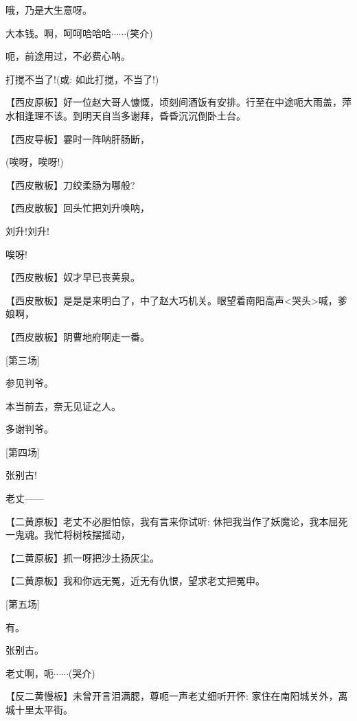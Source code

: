 {哦，乃是大生意呀。}

{大本钱。啊，呵呵哈哈哈$\cdots{}\cdots{}$(笑介)}

{呃，前途用过，不必费心呐。}

{打搅不当了!({\akai 或}: 如此打搅，不当了!)}

\setlength{\hangindent}{60pt} {【{\akai 西皮原板}】好一位赵大哥人慷慨，顷刻间酒饭有安排。行至在中途呃大雨盖，萍水相逢理不该。到明天自当多谢拜，昏昏沉沉倒卧土台。}

\setlength{\hangindent}{60pt} {【{\akai 西皮导板}】霎时一阵呐肝肠断，}

{(唉呀，唉呀!)}

\setlength{\hangindent}{60pt} {【{\akai 西皮散板}】刀绞柔肠为哪般?}

\setlength{\hangindent}{60pt} {【{\akai 西皮散板}】回头忙把刘升唤呐，}

{刘升!刘升!}

{唉呀!}

\setlength{\hangindent}{60pt} {【{\akai 西皮散板}】奴才早已丧黄泉。}

\setlength{\hangindent}{60pt} {【{\akai 西皮散板}】是是是来明白了，中了赵大巧机关。眼望着南阳高声\textless{}哭头\textgreater{}喊，爹娘啊，}

\setlength{\hangindent}{60pt} {【{\akai 西皮散板}】阴曹地府啊走一番。}

{[}第三场{]}

{参见判爷。}

{本当前去，奈无见证之人。}

{多谢判爷。}

{[}第四场{]}

{张别古!}

{老丈------}

\setlength{\hangindent}{60pt} {【{\akai 二黄原板}】老丈不必胆怕惊，我有言来你试听: 休把我当作了妖魔论，我本屈死一鬼魂。我忙将树枝摆摇动，}

\setlength{\hangindent}{60pt} {【{\akai 二黄原板}】抓一呀把沙土扬灰尘。}

\setlength{\hangindent}{60pt} {【{\akai 二黄原板}】我和你远无冤，近无有仇恨，望求老丈把冤申。}

{[}第五场{]}

{有。}

{张别古。}

{老丈啊，呃$\cdots{}\cdots{}$(哭介)}

\setlength{\hangindent}{60pt} {【{\akai 反二黄慢板}】未曾开言泪满腮，尊呃一声老丈细听开怀: 家住在南阳城关外，离城十里太平街。}

